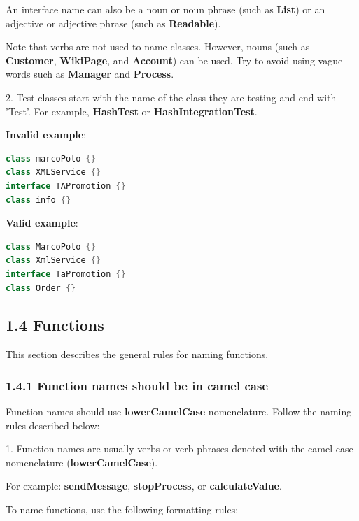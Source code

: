 {{{{{{{{{{{{An interface name can also be a noun or noun phrase (such as \textbf{List}) or an adjective or adjective phrase (such as \textbf{Readable}).

Note that verbs are not used to name classes. However, nouns (such as \textbf{Customer}, \textbf{WikiPage}, and \textbf{Account}) can be used. Try to avoid using vague words such as \textbf{Manager} and \textbf{Process}.



2.	Test classes start with the name of the class they are testing and end with 'Test'. For example, \textbf{HashTest} or \textbf{HashIntegrationTest}.



\textbf{Invalid example}: 

\begin{lstlisting}[language=Kotlin]
class marcoPolo {} 
class XMLService {} 
interface TAPromotion {}
class info {}
\end{lstlisting}


\textbf{Valid example}: 

\begin{lstlisting}[language=Kotlin]
class MarcoPolo {}
class XmlService {}
interface TaPromotion {}
class Order {}
\end{lstlisting}


\subsection*{\textbf{1.4 Functions}}

\label{sec:1.4}

This section describes the general rules for naming functions.

\subsubsection*{\textbf{1.4.1 Function names should be in camel case}}
\leavevmode\newline

\label{sec:1.4.1}

Function names should use \textbf{lowerCamelCase} nomenclature. Follow the naming rules described below:

1.	Function names are usually verbs or verb phrases denoted with the camel case nomenclature (\textbf{lowerCamelCase}).

For example: \textbf{sendMessage}, \textbf{stopProcess}, or \textbf{calculateValue}.

To name functions, use the following formatting rules:



}}}}}}}}}}}}
